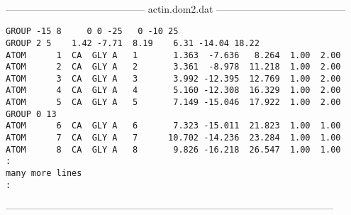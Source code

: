 \begin{singlespace}
\ \\
------------------------------------------
actin.dom2.dat
---------------------------------------
\begin{verbatim}
GROUP -15 8     0 0 -25   0 -10 25
GROUP 2 5    1.42 -7.71  8.19    6.31 -14.04 18.22
ATOM      1  CA  GLY A   1       1.363  -7.636   8.264  1.00  2.00
ATOM      2  CA  GLY A   2       3.361  -8.978  11.218  1.00  2.00
ATOM      3  CA  GLY A   3       3.992 -12.395  12.769  1.00  2.00
ATOM      4  CA  GLY A   4       5.160 -12.308  16.329  1.00  2.00
ATOM      5  CA  GLY A   5       7.149 -15.046  17.922  1.00  2.00
GROUP 0 13
ATOM      6  CA  GLY A   6       7.323 -15.011  21.823  1.00  1.00
ATOM      7  CA  GLY A   7      10.702 -14.236  23.284  1.00  1.00
ATOM      8  CA  GLY A   8       9.826 -16.218  26.547  1.00  1.00
:
many more lines
:
\end{verbatim}
---------------------------------------------------------------------------------------------------
\end{singlespace}

